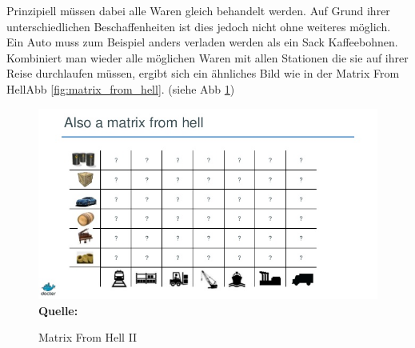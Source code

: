 Prinzipiell müssen dabei alle Waren gleich behandelt werden. Auf Grund ihrer unterschiedlichen Beschaffenheiten ist dies jedoch nicht ohne weiteres möglich. Ein Auto muss zum Beispiel anders verladen werden als ein Sack Kaffeebohnen.
Kombiniert man wieder alle möglichen Waren mit allen Stationen die sie auf ihrer Reise durchlaufen müssen, ergibt sich ein ähnliches Bild wie in der \glqq Matrix From Hell\grqq Abb \ref{fig:matrix_from_hell}. (siehe Abb \ref{fig:waren_matrix_from_hell_ii}) 
\begin{figure}[htbp]
  \centering  
  \includegraphics[scale=0.7]{img/waren_matrix_from_hell.jpg}\\
  \footnotesize\sffamily\textbf{Quelle:} \cite{hykes_docker_2013}
  \caption{Matrix From Hell II}
  \label{fig:waren_matrix_from_hell_ii}
\end{figure}

